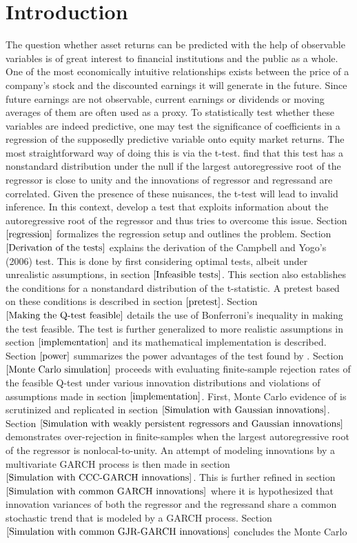 \documentclass{article}
\begin{document}
\section{Introduction}
The question whether asset returns can be predicted with the help of observable variables is of great interest to financial institutions and the public as a whole. One of the most economically intuitive relationships exists between the price of a company's stock and the discounted earnings it will generate in the future. Since future earnings are not observable, current earnings or dividends or moving averages of them are often used as a proxy. To statistically test whether these variables are indeed predictive, one may test the significance of coefficients in a regression of the supposedly predictive variable onto equity market returns. The most straightforward way of doing this is via the t-test. \citet{elliott1994inference} find that this test has a nonstandard distribution under the null if the largest autoregressive root of the regressor is close to unity and the innovations of regressor and regressand are correlated. Given the presence of these nuisances, the t-test will lead to invalid inference. In this context, \citet{campbell2006efficient} develop a test that exploits information about the autoregressive root of the regressor and thus tries to overcome this issue. Section $\ref{regression}$ formalizes the regression setup and outlines the problem. Section $\ref{Derivation of the tests}$ explains the derivation of the Campbell and Yogo's (2006) test. This is done by first considering optimal tests, albeit under unrealistic assumptions, in section $\ref{Infeasible tests}$. This section also establishes the conditions for a nonstandard distribution of the t-statistic. A pretest based on these conditions is described in section $\ref{pretest}$. Section $\ref{Making the Q-test feasible}$ details the use of Bonferroni's inequality in making the test feasible.  The test is further generalized to more realistic assumptions in section $\ref{implementation}$ and its mathematical implementation is described. Section $\ref{power}$ summarizes the power advantages of the test found by \citet{campbell2006efficient}. Section $\ref{Monte Carlo simulation}$ proceeds with evaluating finite-sample rejection rates of the feasible Q-test under various innovation distributions and violations of assumptions made in section $\ref{implementation}$. First, Monte Carlo evidence of \citet{campbell2006efficient} is scrutinized and replicated in section $\ref{Simulation with Gaussian innovations}$. Section $\ref{Simulation with weakly persistent regressors and Gaussian innovations}$ demonstrates over-rejection in finite-samples when the largest autoregressive root of the regressor is nonlocal-to-unity. An attempt of modeling innovations by a multivariate GARCH process is then made in section $\ref{Simulation with CCC-GARCH innovations}$. This is further refined in section $\ref{Simulation with common GARCH innovations}$ where it is hypothesized that innovation variances of both the regressor and the regressand share a common stochastic trend that is modeled by a GARCH process. Section $\ref{Simulation with common GJR-GARCH innovations}$ concludes the Monte Carlo 
\end{document}
